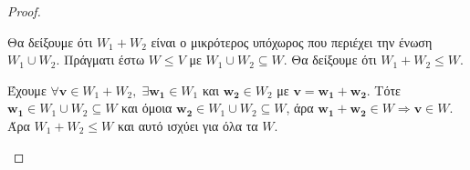 \begin{proof}
\begin{myitemize}
    \item Θα δείξουμε ότι $ W_{1}+W_{2} $ είναι ο μικρότερος υπόχωρος που περιέχει 
      την ένωση $ W_{1} \cup W_{2} $. Πράγματι
      έστω $ W \leq V $ με $ W_{1} \cup W_{2} \subseteq W $. Θα δείξουμε ότι 
      $ W_{1}+W_{2} \leq W $.

      Έχουμε $ \forall \mathbf{v} \in W_{1} + W_{2}, \; \exists \mathbf{w_{1}} 
      \in W_{1}  $ και $ \mathbf{w_{2}} \in W_{2} $ με $ \mathbf{v} = 
      \mathbf{w_{1}}+ \mathbf{w_{2}} $.  Τότε $ \mathbf{w_{1}} \in W_{1} \cup W_{2} 
      \subseteq W $
      και όμοια $ \mathbf{w_{2}} \in W_{1} \cup W_{2} \subseteq W $, άρα 
      $ \mathbf{w_{1}}+ \mathbf{w_{2}} \in W \Rightarrow \mathbf{v} \in W $. 
      Άρα $ W_{1}+W_{2} \leq W $ 
      και αυτό ισχύει για όλα τα $W$. 
  \end{myitemize}
\end{proof} 

